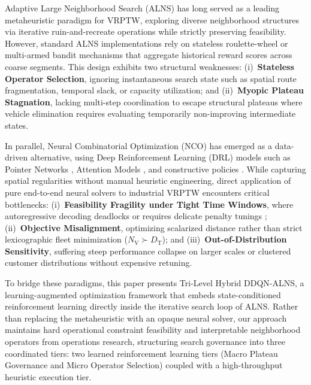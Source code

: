 \documentclass{ieeeaccess}
\newcommand{\NV}{{N_\mathrm{V}}}
\newcommand{\TD}{{D_\mathrm{T}}}
\begin{document}
Adaptive Large Neighborhood Search (ALNS) \cite{pisinger2007general, Ropke2006} has long served as a leading metaheuristic paradigm for VRPTW, exploring diverse neighborhood structures via iterative ruin-and-recreate operations while strictly preserving feasibility. However, standard ALNS implementations rely on stateless roulette-wheel or multi-armed bandit mechanisms that aggregate historical reward scores across coarse segments. This design exhibits two structural weaknesses: (i)~\textbf{Stateless Operator Selection}, ignoring instantaneous search state such as spatial route fragmentation, temporal slack, or capacity utilization; and (ii)~\textbf{Myopic Plateau Stagnation}, lacking multi-step coordination to escape structural plateaus where vehicle elimination requires evaluating temporarily non-improving intermediate states.

In parallel, Neural Combinatorial Optimization (NCO) has emerged as a data-driven alternative, using Deep Reinforcement Learning (DRL) models such as Pointer Networks \cite{vinyals2015pointer}, Attention Models \cite{kool2019attention}, and constructive policies \cite{nazari2018reinforcement}. While capturing spatial regularities without manual heuristic engineering, direct application of pure end-to-end neural solvers to industrial VRPTW encounters critical bottlenecks: (i)~\textbf{Feasibility Fragility under Tight Time Windows}, where autoregressive decoding deadlocks or requires delicate penalty tunings \cite{falkner2020learning, lin2021deep}; (ii)~\textbf{Objective Misalignment}, optimizing scalarized distance rather than strict lexicographic fleet minimization ($\NV \succ \TD$); and (iii)~\textbf{Out-of-Distribution Sensitivity}, suffering steep performance collapse on larger scales or clustered customer distributions without expensive retuning.

To bridge these paradigms, this paper presents Tri-Level Hybrid DDQN-ALNS, a learning-augmented optimization framework that embeds state-conditioned reinforcement learning directly inside the iterative search loop of ALNS. Rather than replacing the metaheuristic with an opaque neural solver, our approach maintains hard operational constraint feasibility and interpretable neighborhood operators from operations research, structuring search governance into three coordinated tiers: two learned reinforcement learning tiers (Macro Plateau Governance and Micro Operator Selection) coupled with a high-throughput heuristic execution tier. 
\end{document}
